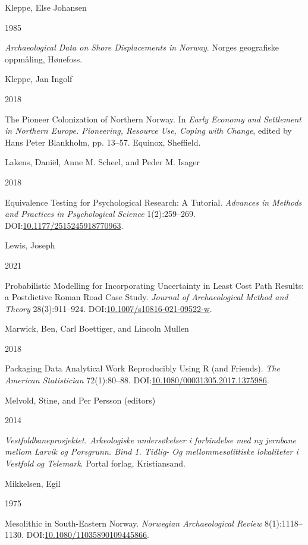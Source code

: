 \documentclass[
]{article}
\newlength{\cslhangindent}
\newlength{\csllabelwidth}
\newlength{\cslentryspacingunit} %
\newenvironment{CSLReferences}[2] %
 {%
  \setlength{\parindent}{0pt}
  \ifodd #1
  \let\oldpar\par
  \def\par{\hangindent=\cslhangindent\oldpar}
  \fi
  \setlength{\parskip}{#2\cslentryspacingunit}
 }%
 {}
\newcommand{\CSLBlock}[1]{#1\hfill\break}
\newcommand{\CSLLeftMargin}[1]{\parbox[t]{\csllabelwidth}{#1}}
\newcommand{\CSLRightInline}[1]{\parbox[t]{\linewidth - \csllabelwidth}{#1}\break}
\begin{document}
\begin{CSLReferences}{0}{0}
\leavevmode{}%
\CSLBlock{Kleppe, Else Johansen}
\CSLLeftMargin{ 1985}
\CSLRightInline{\emph{{Archaeological Data on Shore Displacements in Norway}}. Norges geografiske oppmåling, Hønefoss.}

\leavevmode{}%
\CSLBlock{Kleppe, Jan Ingolf}
\CSLLeftMargin{ 2018}
\CSLRightInline{{The Pioneer Colonization of Northern Norway}. In \emph{{Early Economy and Settlement in Northern Europe. Pioneering, Resource Use, Coping with Change}}, edited by Hans Peter Blankholm, pp. 13--57. Equinox, Sheffield.}

\leavevmode{}%
\CSLBlock{Lakens, Daniël, Anne M. Scheel, and Peder M. Isager}
\CSLLeftMargin{ 2018}
\CSLRightInline{Equivalence Testing for Psychological Research: A Tutorial. \emph{Advances in Methods and Practices in Psychological Science} 1(2):259--269. DOI:\href{https://doi.org/10.1177/2515245918770963}{10.1177/2515245918770963}.}

\leavevmode{}%
\CSLBlock{Lewis, Joseph}
\CSLLeftMargin{ 2021}
\CSLRightInline{Probabilistic Modelling for Incorporating Uncertainty in Least Cost Path Results: a Postdictive Roman Road Case Study. \emph{Journal of Archaeological Method and Theory} 28(3):911--924. DOI:\href{https://doi.org/10.1007/s10816-021-09522-w}{10.1007/s10816-021-09522-w}.}

\leavevmode{}%
\CSLBlock{Marwick, Ben, Carl Boettiger, and Lincoln Mullen}
\CSLLeftMargin{ 2018}
\CSLRightInline{{Packaging Data Analytical Work Reproducibly Using R (and Friends)}. \emph{The American Statistician} 72(1):80--88. DOI:\href{https://doi.org/10.1080/00031305.2017.1375986}{10.1080/00031305.2017.1375986}.}

\leavevmode{}%
\CSLBlock{Melvold, Stine, and Per Persson (editors)}
\CSLLeftMargin{ 2014}
\CSLRightInline{\emph{{Vestfoldbaneprosjektet. Arkeologiske undersøkelser i forbindelse med ny jernbane mellom Larvik og Porsgrunn. Bind 1. Tidlig- Og mellommesolittiske lokaliteter i Vestfold og Telemark}}. Portal forlag, Kristiansand.}

\leavevmode{}%
\CSLBlock{Mikkelsen, Egil}
\CSLLeftMargin{ 1975}
\CSLRightInline{{Mesolithic in South-Eastern Norway}. \emph{Norwegian Archaeological Review} 8(1):1118--1130. DOI:\href{https://doi.org/10.1080/11035890109445866}{10.1080/11035890109445866}.}


\end{CSLReferences}
\end{document}
